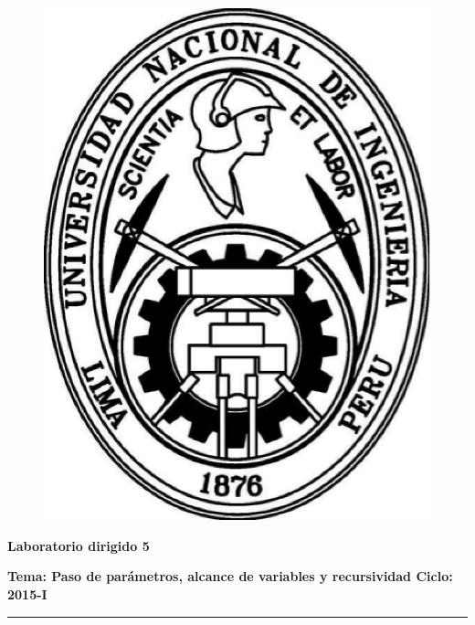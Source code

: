 \documentclass[10pt,a4paper]{article}
\begin{document}
\begin{center}
\begin{figure}[ht!]
\begin{minipage}[c]{0.2\linewidth}
\includegraphics[scale=0.22]{EscudoUNI.eps}
\end{minipage}
\hfill{}
\begin{minipage}{0,8\columnwidth}
\centering{}
\end{minipage}
\end{figure}
\end{center}
\vspace*{-1.2cm}
\noindent

\begin{center}
\textbf{\Large Laboratorio dirigido 5}
\end{center}
\textbf{Tema: Paso de par\'ametros, alcance de variables y recursividad \hfill Ciclo: 2015-I}
\noindent
\rule{\textwidth}{1pt}
\newline
\end{document}
